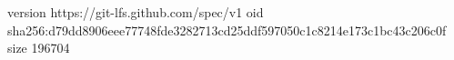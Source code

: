 version https://git-lfs.github.com/spec/v1
oid sha256:d79dd8906eee77748fde3282713cd25ddf597050c1c8214e173c1bc43c206c0f
size 196704
